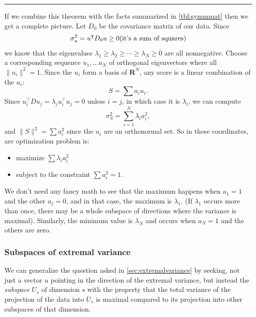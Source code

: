 \documentclass[
]{article}
\providecommand{\tightlist}{%
  \setlength{\itemsep}{0pt}\setlength{\parskip}{0pt}}
\begin{document}
\begin{center}\rule{0.5\linewidth}{0.5pt}\end{center}

If we combine this theorem with the facts summarized in
\cref{tbl:symmmat} then we get a complete picture. Let \(D_{0}\) be the
covariance matrix of our data. Since \[
\sigma_{u}^2 = u^{\intercal}D_{0}u\ge 0 \hbox{(it's a sum of squares)}
\] we know that the eigenvalues
\(\lambda_{1}\ge\lambda_{2}\ge \cdots \ge \lambda_{N}\ge 0\) are all
nonnegative. Choose a corresponding sequence \(u_{1},\ldots u_{N}\) of
orthogonal eigenvectors where all \(\|u_{i}\|^2=1\). Since the \(u_{i}\)
form a basis of \(\mathbf{R}^{N}\), any score is a linear combination of
the \(u_{i}\): \[
S = \sum a_{i}u_{i}.
\] Since
\(u_{i}^{\intercal}Du_{j} = \lambda_{j}u_{i}^{\intercal}u_{j} = 0\)
unless \(i=j\), in which case it is \(\lambda_{i}\), we can compute \[
\sigma_{S}^2 = \sum_{i=1}^{N} \lambda_{i}a_{i}^2,
\] and \(\|S\|^2=\sum a_{i}^2\) since the \(u_{i}\) are an orthonormal
set. So in these coordinates, are optimization problem is:

\begin{itemize}
\tightlist
\item
  maximize \(\sum \lambda_{i}a_{i}^2\)
\item
  subject to the constraint \(\sum a_{i}^2 = 1\).
\end{itemize}

We don't need any fancy math to see that the maximum happens when
\(a_{1}=1\) and the other \(a_{j}=0\), and in that case, the maximum is
\(\lambda_{1}\). (If \(\lambda_{1}\) occurs more than once, there may be
a whole subspace of directions where the variance is maximal).
Similarly, the minimum value is \(\lambda_{N}\) and occurs when
\(a_{N}=1\) and the others are zero.

\hypertarget{sec:subspaces}{%
\subsubsection{Subspaces of extremal variance}\label{sec:subspaces}}

We can generalize the question asked in \cref{sec:extremalvariance} by
seeking, not just a vector \(u\) pointing in the direction of the
extremal variance, but instead the \emph{subspace} \(U_{s}\) of
dimension \(s\) with the property that the total variance of the
projection of the data into \(U_{s}\) is maximal compared to its
projection into other subspaces of that dimension.
\end{document}
